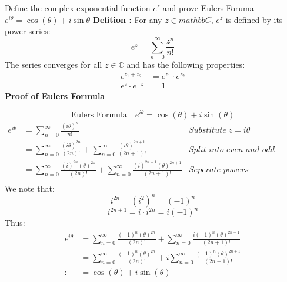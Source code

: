 \documentclass[a4paper, 8pt]{extarticle}
\begin{document}
\begin{examplebox}{Define the complex exponential function $e^z$ and prove Eulers Foruma $e^{i \theta} = \cos(\theta) + i\sin\theta$}{}
	\label{sol:2017Q1b}
	\textbf{Defition :} For any $z \in mathbb{C}$, $e^z$ is defined by its power series:
	$$e^z = \sum_{n=0}^{\infty} \frac{z^n}{n!}$$
	The series converges for all $z \in \mathbb{C}$ and has the following properties:
	\begin{align*}
		e^{z_1 + z_2}      & = e^{z_1} \cdot e^{z_2} \\
		e^{z} \cdot e^{-z} & = 1
	\end{align*}
	\textbf{Proof of Eulers Formula}

	$$\text{Eulers Formula} \quad e^{i \theta} = \cos(\theta) + i\sin(\theta)$$
	\begin{align*}
		e^{i \theta} & =  \textstyle\sum_{n=0}^{\infty}  \frac{(i\theta)^n}{n!}                                                                             & \textit{Substitute}\; z=i\theta         \\
		             & = \textstyle\sum_{n=0}^{\infty} \frac{(i\theta)^{2n}}{(2n)!} + \sum_{n=0}^{\infty} \frac{(i\theta)^{2n+1}}{(2n+1)!}                  & \textit{Split into even and odd powers} \\
		             & = \textstyle\sum_{n=0}^{\infty} \frac{(i)^{2n}(\theta)^{2n}}{(2n)!} + \sum_{n=0}^{\infty} \frac{(i)^{2n+1} (\theta)^{2n+1}}{(2n+1)!} & \textit{Seperate powers}                \\
	\end{align*}
	\quad We note that:
	$$i^{2n} = (i^{2})^n = (-1)^n$$
	$$i^{2n+1} = i \cdot i^{2n} = i(-1)^n$$
	Thus:
	\begin{align*}
		e^{i \theta} & =  \textstyle\sum_{n=0}^{\infty} \frac{(-1)^n(\theta)^{2n}}{(2n)!}
		+ \sum_{n=0}^{\infty} \frac{i(-1)^n (\theta)^{2n+1}}{(2n+1)!}                     \\
		             & = \textstyle\sum_{n=0}^{\infty} \frac{(-1)^n(\theta)^{2n}}{(2n)!}
		+ i\sum_{n=0}^{\infty} \frac{(-1)^n (\theta)^{2n+1}}{(2n+1)!}                     \\:
		             & = \cos(\theta) + i\sin(\theta)
	\end{align*}
\end{examplebox}
\end{document}
